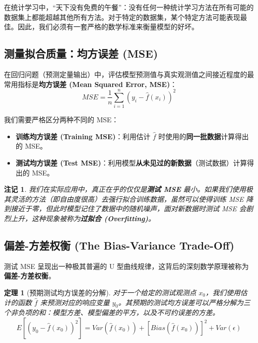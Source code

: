 \documentclass[UTF8]{ctexart}
\newtheorem{theorem}{定理}[section]
\newtheorem{remark}{注记}[section]
\numberwithin{equation}{section}
\begin{document}
在统计学习中，“天下没有免费的午餐”：没有任何一种统计学习方法在所有可能的数据集上都能超越其他所有方法。对于特定的数据集，某个特定方法可能表现最佳。因此，我们必须有一套严格的数学标准来衡量模型的好坏。

\subsection{测量拟合质量：均方误差 (MSE)}

在回归问题（预测定量输出）中，评估模型预测值与真实观测值之间接近程度的最常用指标是\textbf{均方误差 (Mean Squared Error, MSE)}：
\begin{equation}
MSE = \frac{1}{n} \sum_{i=1}^n (y_i - \hat{f}(x_i))^2
\end{equation}

我们需要严格区分两种不同的 MSE：
\begin{itemize}
    \item \textbf{训练均方误差 (Training MSE)}：利用估计 $\hat{f}$ 时使用的\textbf{同一批数据}计算得出的 MSE。
    \item \textbf{测试均方误差 (Test MSE)}：利用模型\textbf{从未见过的新数据}（测试数据）计算得出的 MSE。
\end{itemize}
\begin{remark}
我们在实际应用中，真正在乎的仅仅是\textbf{测试 MSE} 最小。如果我们使用极其灵活的方法（即自由度很高）去强行拟合训练数据，虽然可以使得训练 MSE 降到接近于零，但此时模型记住了数据中的随机噪声，面对新数据时测试 MSE 会剧烈上升，这种现象被称为\textbf{过拟合 (Overfitting)}。
\end{remark}

\subsection{偏差-方差权衡 (The Bias-Variance Trade-Off)}

测试 MSE 呈现出一种极其普遍的 U 型曲线规律，这背后的深刻数学原理被称为\textbf{偏差-方差权衡}。

\begin{theorem}[预期测试均方误差的分解]
对于一个给定的测试观测点 $x_0$，我们使用估计的函数 $\hat{f}$ 来预测对应的响应变量 $y_0$。其预期的测试均方误差可以严格分解为三个非负项的和：模型方差、模型偏差的平方，以及不可约误差的方差。
\begin{equation}
E[(y_0 - \hat{f}(x_0))^2] = Var(\hat{f}(x_0)) + [Bias(\hat{f}(x_0))]^2 + Var(\epsilon)
\end{equation}
\end{theorem}
\end{document}
